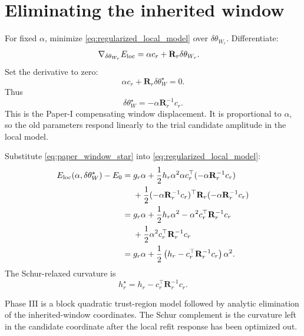 \documentclass[10pt,twocolumn]{article}
\begin{document}
\section{Eliminating the inherited window}

For fixed \(\alpha\), minimize \eqref{eq:regularized_local_model} over \(\delta\theta_{W_r}\). Differentiate:
\begin{align}
\nabla_{\delta\theta_{W_r}}E_{\rm loc}
&=
\alpha c_r+\mathbf R_r\delta\theta_{W_r}.
\label{eq:window_derivative}
\end{align}
Set the derivative to zero:
\begin{equation}
\alpha c_r+\mathbf R_r\delta\theta_W^\star=0.
\label{eq:window_stationarity}
\end{equation}
Thus
\begin{equation}
\boxed{
\delta\theta_W^\star=-\alpha\mathbf R_r^{-1}c_r.
}
\label{eq:paper_window_star}
\end{equation}
This is the Paper-I compensating window displacement. It is proportional to \(\alpha\), so the old parameters respond linearly to the trial candidate amplitude in the local model.

Substitute \eqref{eq:paper_window_star} into \eqref{eq:regularized_local_model}:
\begin{align}
E_{\rm loc}(\alpha,\delta\theta_W^\star)-E_0
={}&g_r\alpha+\frac12h_r\alpha^2
\alpha c_r^\top(-\alpha\mathbf R_r^{-1}c_r)
\notag\\
&+\frac12(-\alpha\mathbf R_r^{-1}c_r)^\top
\mathbf R_r
(-\alpha\mathbf R_r^{-1}c_r)
\notag\\
={}&g_r\alpha+\frac12h_r\alpha^2
-\alpha^2c_r^\top\mathbf R_r^{-1}c_r
\notag\\
&+\frac12\alpha^2c_r^\top\mathbf R_r^{-1}c_r
\notag\\
={}&g_r\alpha+\frac12
\left(h_r-c_r^\top\mathbf R_r^{-1}c_r\right)\alpha^2.
\label{eq:schur_substitution_paper}
\end{align}
The Schur-relaxed curvature is
\begin{equation}
\boxed{
h_r^\star
=h_r-c_r^\top\mathbf R_r^{-1}c_r.
}
\label{eq:h_tilde_paper}
\end{equation}

\begin{jargonbox}
Phase III is a block quadratic trust-region model followed by analytic elimination of the inherited-window coordinates. The Schur complement is the curvature left in the candidate coordinate after the local refit response has been optimized out.
\end{jargonbox}
\end{document}
